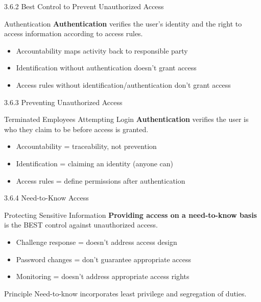 \documentclass{beamer}
\begin{document}
	\begin{frame}{3.6.2 Best Control to Prevent Unauthorized Access}
		\begin{block}{Authentication}
			\textbf{Authentication} verifies the user's identity and the right to access information according to access rules.
		\end{block}
		\begin{itemize}
			\item Accountability maps activity back to responsible party
			\item Identification without authentication doesn't grant access
			\item Access rules without identification/authentication don't grant access
		\end{itemize}
	\end{frame}
	
	\begin{frame}{3.6.3 Preventing Unauthorized Access}
		\begin{block}{Terminated Employees Attempting Login}
			\textbf{Authentication} verifies the user is who they claim to be before access is granted.
		\end{block}
		\begin{itemize}
			\item Accountability = traceability, not prevention
			\item Identification = claiming an identity (anyone can)
			\item Access rules = define permissions after authentication
		\end{itemize}
	\end{frame}
	
	\begin{frame}{3.6.4 Need-to-Know Access}
		\begin{block}{Protecting Sensitive Information}
			\textbf{Providing access on a need-to-know basis} is the BEST control against unauthorized access.
		\end{block}
		\begin{itemize}
			\item Challenge response = doesn't address access design
			\item Password changes = don't guarantee appropriate access
			\item Monitoring = doesn't address appropriate access rights
		\end{itemize}
		\begin{exampleblock}{Principle}
			Need-to-know incorporates least privilege and segregation of duties.
		\end{exampleblock}
	\end{frame}
	
\end{document}
